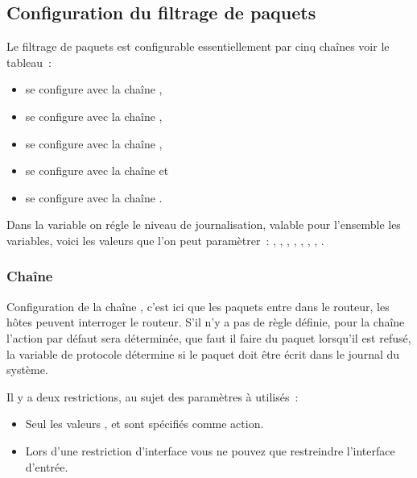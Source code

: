 \subsection{Configuration du filtrage de paquets}

Le filtrage de paquets est configurable essentiellement par cinq chaînes
voir le tableau~:

\begin{itemize}
  \item {} se configure avec la chaîne ,
  \item {} se configure avec la chaîne ,
  \item {} se configure avec la chaîne ,
  \item {} se configure avec la chaîne  et
  \item {} se configure avec la chaîne .
\end{itemize}

Dans la variable  on régle le niveau
de journalisation, valable pour l'ensemble les variables, voici les valeurs que
l'on peut paramètrer~: , , ,
, , , ,
.

\subsubsection{Chaîne }

Configuration de la chaîne , c'est ici que les paquets entre
dans le routeur, les hôtes peuvent interroger le routeur. S'il n'y a pas de
règle définie, pour la chaîne  l'action par défaut sera déterminée,
que faut il faire du paquet lorsqu'il est refusé, la variable de protocole
détermine si le paquet doit être écrit dans le journal du système.

Il y a deux restrictions, au sujet des paramètres à utilisés~:
\begin{itemize}
  \item Seul les valeurs ,  et 
    sont spécifiés comme action.
  \item Lors d'une restriction d'interface vous ne pouvez que restreindre
    l'interface d'entrée.
\end{itemize}

